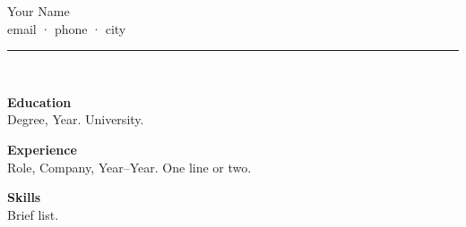 \documentclass[11pt,a4paper]{article}
\begin{document}
\begin{center}
\vspace{0.5cm}
{\LARGE Your Name}\\[0.8em]
email \quad · \quad phone \quad · \quad city\\[0.6em]
\rule{1.8cm}{2.2cm}\\[0.6em]
\end{center}

\vspace{1em}
\textbf{Education}\\
Degree, Year. University.

\vspace{0.8em}
\textbf{Experience}\\
Role, Company, Year--Year. One line or two.

\vspace{0.8em}
\textbf{Skills}\\
Brief list.
\end{document}
